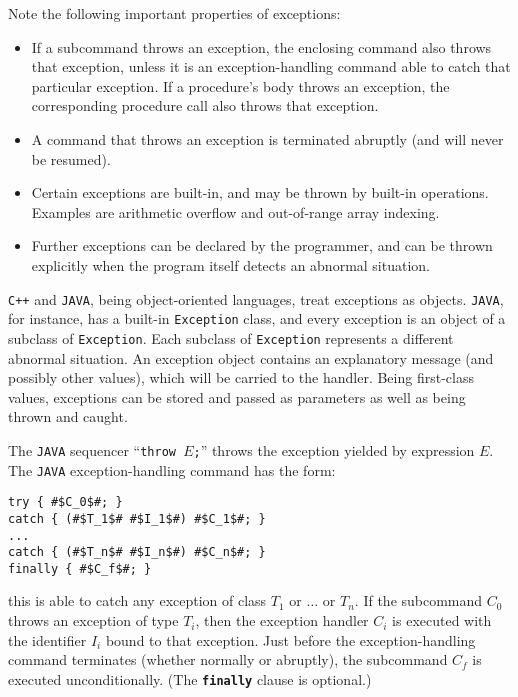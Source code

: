 \noindent Note the following important properties of exceptions:
\begin{itemize}
  \item If a subcommand throws an exception, the enclosing command also throws that exception, unless it is an exception-handling command able to catch that particular exception. If a procedure's body throws an exception, the corresponding procedure call also throws that exception.
  \item A command that throws an exception is terminated abruptly (and will never be resumed).
  \item Certain exceptions are built-in, and may be thrown by built-in operations. Examples are arithmetic overflow and out-of-range array indexing.
  \item Further exceptions can be declared by the programmer, and can be thrown explicitly when the program itself detects an abnormal situation.
\end{itemize}
\texttt{C++} and \texttt{JAVA}, being object-oriented languages, treat exceptions as objects. \texttt{JAVA}, for instance, has a built-in \texttt{Exception} class, and every exception is an object of a subclass of \texttt{Exception}. Each subclass of \texttt{Exception} represents a different abnormal situation. An exception object contains an explanatory message (and possibly other values), which will be carried to the handler. Being first-class values, exceptions can be stored and passed as parameters as well as being thrown and caught.

The \texttt{JAVA} sequencer ``\texttt{throw $E$;}'' throws the exception yielded by expression $E$. The \texttt{JAVA} exception-handling command has the form:
\begin{verbatim}
try { #$C_0$#; }
catch { (#$T_1$# #$I_1$#) #$C_1$#; }
...
catch { (#$T_n$# #$I_n$#) #$C_n$#; } 
finally { #$C_f$#; }
\end{verbatim}
this is able to catch any exception of class $T_1$ or $\ldots$ or $T_n$. If the subcommand $C_0$ throws an exception of type $T_i$, then the exception handler $C_i$ is executed with the identifier $I_i$ bound to that exception. Just before the exception-handling command terminates (whether normally or abruptly), the subcommand $C_f$ is executed unconditionally. (The \texttt{\textbf{finally}} clause is optional.)

